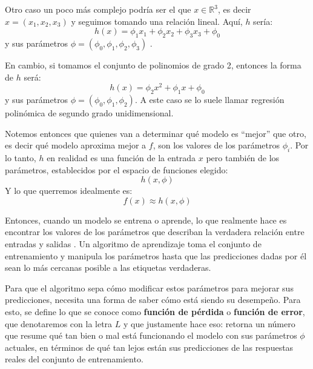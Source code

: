 \documentclass[../../main.tex]{subfiles}
\begin{document}
Otro caso un poco más complejo podría ser el que \(x \in \mathbb{R}^3\), es decir \(x=(x_1, x_2, x_3)\) y seguimos tomando una relación lineal. Aquí, \(h\) sería:
\[h(x) = \phi_1 x_1 + \phi_2 x_2 + \phi_3 x_3 + \phi_0\] 
y sus parámetros \(\phi=(\phi_0, \phi_1, \phi_2, \phi_3)\)\footnotemark
{}.


En cambio, si tomamos el conjunto de polinomios de grado 2, entonces la forma de \(h\) será:
\[h(x) = \phi_2 x^2 + \phi_1 x + \phi_0\]
y sus parámetros \(\phi=(\phi_0, \phi_1, \phi_2)\). A este caso se lo suele llamar regresión polinómica de segundo grado unidimensional.

Notemos entonces que quienes van a determinar qué modelo es ``mejor'' que otro, es decir qué modelo aproxima mejor a \(f\), son los valores de los parámetros \(\phi_i\). Por lo tanto, \(h\) en realidad es una función de la entrada \(x\) pero también de los parámetros, establecidos por el espacio de funciones elegido:
\[h(x, \phi)\]
Y lo que querremos idealmente es:
\[f(x) \approx h(x, \phi)\]

Entonces, cuando un modelo se entrena o aprende, lo que realmente hace es encontrar los valores de los parámetros que describan la verdadera relación entre entradas y salidas \cite{prince2024understanding}. Un algoritmo de aprendizaje toma el conjunto de entrenamiento y manipula los parámetros hasta que las predicciones dadas por él sean lo más cercanas posible a las etiquetas verdaderas.

Para que el algoritmo sepa cómo modificar estos parámetros para mejorar sus predicciones, necesita una forma de saber cómo está siendo su desempeño. Para esto, se define lo que se conoce como \textbf{función de pérdida} o \textbf{función de error}, que denotaremos con la letra \(L\) y que justamente hace eso: retorna un número que resume qué tan bien o mal está funcionando el modelo con sus parámetros \(\phi\) actuales, en términos de qué tan lejos están sus predicciones de las respuestas reales del conjunto de entrenamiento.
\end{document}
